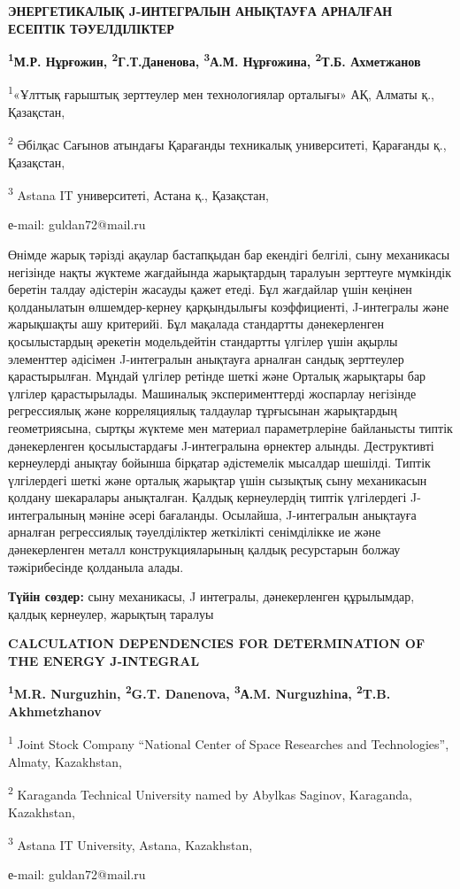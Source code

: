 \begin{center}
{\large\bfseries ЭНЕРГЕТИКАЛЫҚ J-ИНТЕГРАЛЫН АНЫҚТАУҒА АРНАЛҒАН ЕСЕПТІК ТӘУЕЛДІЛІКТЕР}

{\bfseries \textsuperscript{1}М.Р. Нұрғожин,
\textsuperscript{2}Г.Т.Даненова\envelope,
\textsuperscript{3}А.М. Нұрғожина, \textsuperscript{2}Т.Б. Ахметжанов}

\textsuperscript{1}«Ұлттық ғарыштық зерттеулер мен технологиялар
орталығы» АҚ, Алматы қ., Қазақстан,

\textsuperscript{2} Әбілқас Сағынов атындағы Қарағанды техникалық
университеті, Қарағанды қ., Қазақстан,

\textsuperscript{3} Astana IT университеті, Астана қ., Қазақстан,

е-mail: guldan72@mail.ru
\end{center}

Өнімде жарық тәрізді ақаулар бастапқыдан бар екендігі белгілі, сыну
механикасы негізінде нақты жүктеме жағдайында жарықтардың таралуын
зерттеуге мүмкіндік беретін талдау әдістерін жасауды қажет етеді. Бұл
жағдайлар үшін кеңінен қолданылатын өлшемдер-кернеу қарқындылығы
коэффициенті, J-интегралы және жарықшақты ашу критерийі. Бұл мақалада
стандартты дәнекерленген қосылыстардың әрекетін модельдейтін стандартты
үлгілер үшін ақырлы элементтер әдісімен J-интегралын анықтауға арналған
сандық зерттеулер қарастырылған. Мұндай үлгілер ретінде шеткі және
Орталық жарықтары бар үлгілер қарастырылады. Машиналық эксперименттерді
жоспарлау негізінде регрессиялық және корреляциялық талдаулар тұрғысынан
жарықтардың геометриясына, сыртқы жүктеме мен материал параметрлеріне
байланысты типтік дәнекерленген қосылыстардағы J-интегралына өрнектер
алынды. Деструктивті кернеулерді анықтау бойынша бірқатар әдістемелік
мысалдар шешілді. Типтік үлгілердегі шеткі және орталық жарықтар үшін
сызықтық сыну механикасын қолдану шекаралары анықталған. Қалдық
кернеулердің типтік үлгілердегі J-интегралының мәніне әсері бағаланды.
Осылайша, J-интегралын анықтауға арналған регрессиялық тәуелділіктер
жеткілікті сенімділікке ие және дәнекерленген металл конструкцияларының
қалдық ресурстарын болжау тәжірибесінде қолданыла алады.

{\bfseries Түйін сөздер:} сыну механикасы, J интегралы, дәнекерленген
құрылымдар, қалдық кернеулер, жарықтың таралуы

\begin{center}
{\large\bfseries CALCULATION DEPENDENCIES FOR DETERMINATION OF THE ENERGY J-INTEGRAL}

{\bfseries \textsuperscript{1}M.R. Nurguzhin, \textsuperscript{2}G.T.
Danenova\envelope , \textsuperscript{3}А.M. Nurguzhinа,
\textsuperscript{2}T.B. Akhmetzhanov}

\textsuperscript{1} Joint Stock Company ``National Center of Space
Researches and Technologies'', Almaty, Kazakhstan,

\textsuperscript{2} Karaganda Technical University named by Abylkas
Saginov, Karaganda, Kazakhstan,

\textsuperscript{3} Astana IT University, Astana, Kazakhstan,

е-mail: guldan72@mail.ru
\end{center}

